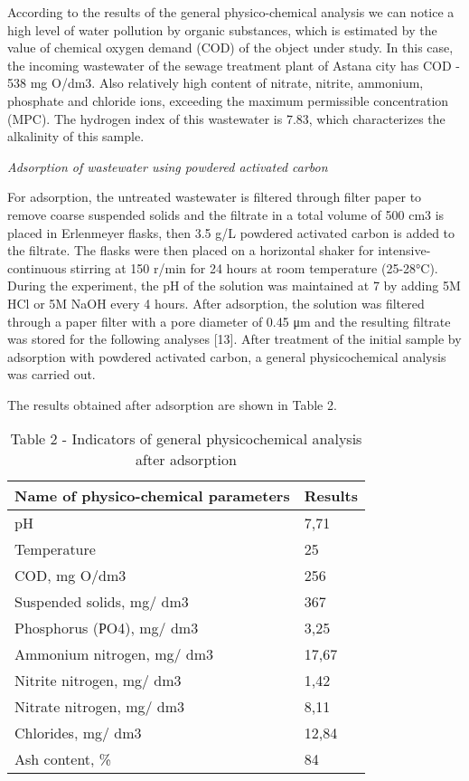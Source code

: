 \begin{multicols}{2}
According to the results of the general physico-chemical analysis we can
notice a high level of water pollution by organic substances, which is
estimated by the value of chemical oxygen demand (COD) of the object
under study. In this case, the incoming wastewater of the sewage
treatment plant of Astana city has COD - 538 mg O/dm3. Also relatively
high content of nitrate, nitrite, ammonium, phosphate and chloride ions,
exceeding the maximum permissible concentration (MPC). The hydrogen
index of this wastewater is 7.83, which characterizes the alkalinity of
this sample.

\emph{Adsorption of wastewater using powdered activated carbon}

For adsorption, the untreated wastewater is filtered through filter
paper to remove coarse suspended solids and the filtrate in a total
volume of 500 cm3 is placed in Erlenmeyer flasks, then 3.5 g/L powdered
activated carbon is added to the filtrate. The flasks were then placed
on a horizontal shaker for intensive-continuous stirring at 150 r/min
for 24 hours at room temperature (25-28°C). During the experiment, the
pH of the solution was maintained at 7 by adding 5M HCl or 5M NaOH every
4 hours. After adsorption, the solution was filtered through a paper
filter with a pore diameter of 0.45 μm and the resulting filtrate was
stored for the following analyses {[}13{]}. After treatment of the
initial sample by adsorption with powdered activated carbon, a general
physicochemical analysis was carried out.

The results obtained after adsorption are shown in Table 2.
\end{multicols}

\begin{table}[H]
\caption*{Table 2 - Indicators of general physicochemical analysis after adsorption}
\centering
\begin{tabular}{|l|l|}
\hline
Name of physico-chemical parameters & Results \\ \hline
pH                                  & 7,71    \\ \hline
Temperature                         & 25      \\ \hline
COD, mg O/dm3                       & 256     \\ \hline
Suspended solids, mg/ dm3           & 367     \\ \hline
Phosphorus (РO4), mg/ dm3           & 3,25    \\ \hline
Ammonium nitrogen, mg/ dm3          & 17,67   \\ \hline
Nitrite nitrogen, mg/ dm3           & 1,42    \\ \hline
Nitrate nitrogen, mg/ dm3           & 8,11    \\ \hline
Chlorides, mg/ dm3                  & 12,84   \\ \hline
Ash content, \%                     & 84      \\ \hline
\end{tabular}
\end{table}

